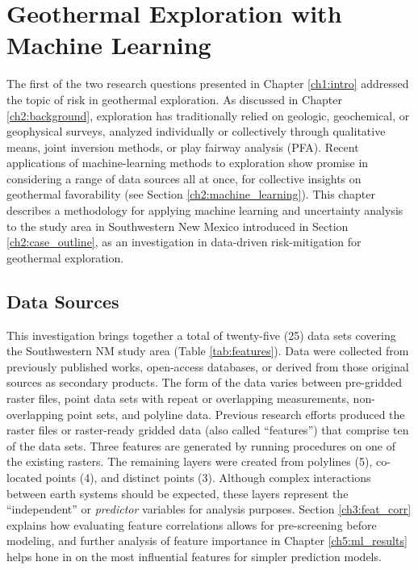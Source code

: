 \chapter{Geothermal Exploration with Machine Learning}\label{ch3:expl_ml_prep}

The first of the two research questions presented in Chapter \ref{ch1:intro} addressed the topic of risk in geothermal exploration. As discussed in Chapter \ref{ch2:background}, exploration has traditionally relied on geologic, geochemical, or geophysical surveys, analyzed individually or collectively through qualitative means, joint inversion methods, or play fairway analysis (PFA). Recent applications of machine-learning methods to exploration show promise in considering a range of data sources all at once, for collective insights on geothermal favorability (see Section \ref{ch2:machine_learning}). This chapter describes a methodology for applying machine learning and uncertainty analysis to the study area in Southwestern New Mexico introduced in Section \ref{ch2:case_outline}, as an investigation in data-driven risk-mitigation for geothermal exploration.

\section{Data Sources}\label{ch3:expl_data_src}

This investigation brings together a total of twenty-five (25) data sets covering the Southwestern NM study area (Table \ref{tab:features}). Data were collected from previously published works, open-access databases, or derived from those original sources as secondary products. The form of the data varies between pre-gridded raster files, point data sets with repeat or overlapping measurements, non-overlapping point sets, and polyline data. Previous research efforts produced the raster files or raster-ready gridded data (also called ``features”) that comprise ten of the data sets. Three features are generated by running procedures on one of the existing rasters. The remaining layers were created from polylines (5), co-located points (4), and distinct points (3). Although complex interactions between earth systems should be expected, these layers represent the ``independent'' or \textit{predictor} variables for analysis purposes. Section \ref{ch3:feat_corr} explains how evaluating feature correlations allows for pre-screening before modeling, and further analysis of feature importance in Chapter \ref{ch5:ml_results} helps hone in on the most influential features for simpler prediction models.

